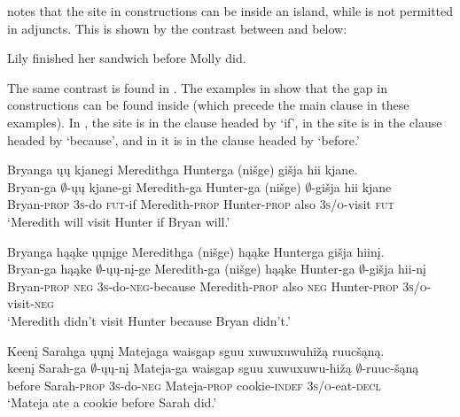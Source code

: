 \documentclass[output=paper]{LSP/langsci}
\begin{document}
\citet{Goldberg2005} notes that the  site in  constructions can be inside an  island, while  is not permitted in adjuncts. This is shown by the contrast between  and  below:
 
\ea
\ea\label{ex:johnson:34a} 
Lily finished her sandwich before Molly did.
\label{ex:johnson:34b}
\z
\z

The same contrast is found in . The examples in  show that the gap in  constructions can be found inside   (which precede the main clause in these examples). In , the  site is in the clause headed by `if', in  the  site is in the clause headed by `because', and in  it is in the clause headed by `before.'
 
\ea\label{ex:johnson:35}
\ea\label{ex:johnson:35a} 
\glll Bryanga ųų kjanegi Meredithga Hunterga (nišge) {gišja hii} kjane.\\
Bryan-ga $\emptyset$-ųų kjane-gi Meredith-ga Hunter-ga (nišge) $\emptyset$-{gišja hii} kjane\\
Bryan-\textsc{prop} \textsc{3s}-do \textsc{fut}-if Meredith-\textsc{prop} Hunter-\textsc{prop} also \textsc{3s/o}-visit \textsc{fut}\\
\trans `Meredith will visit Hunter if Bryan will.'
 
\ex\label{ex:johnson:35b} 
\glll Bryanga hąąke ųųnįge Meredithga (nišge) hąąke Hunterga {gišja hiinį}.\\
Bryan-ga hąąke $\emptyset$-ųų-nį-ge Meredith-ga (nišge) hąąke Hunter-ga $\emptyset$-{gišja hii-nį}\\
Bryan-\textsc{prop} \textsc{neg} \textsc{3s}-do-\textsc{neg}-because Meredith-\textsc{prop} also \textsc{neg} Hunter-\textsc{prop} \textsc{3s/o}-visit-\textsc{neg}\\
\trans `Meredith didn't visit Hunter because Bryan didn't.'
 
\ex\label{ex:johnson:35c} 
\glll Keenį Sarahga ųųnį Matejaga {waisgap sguu xuwuxuwuhižą} ruucšąną.\\
keenį Sarah-ga $\emptyset$-ųų-nį Mateja-ga {waisgap sguu xuwuxuwu-hižą} $\emptyset$-ruuc-šąną\\
before Sarah-\textsc{prop} \textsc{3s}-do-\textsc{neg} Mateja-\textsc{prop} cookie-\textsc{indef} \textsc{3s/o}-eat-\textsc{decl}\\
\trans `Mateja ate a cookie before Sarah did.'
\z
\z
\end{document}
